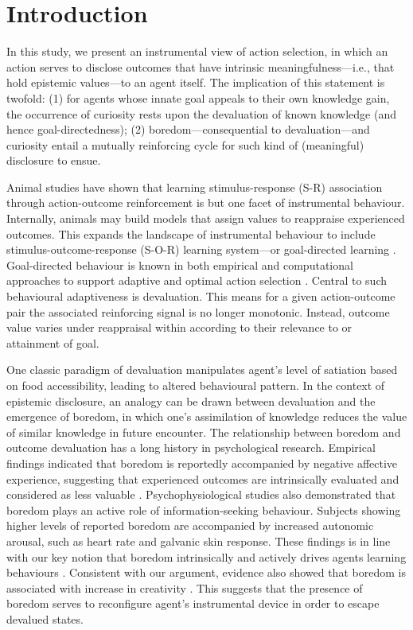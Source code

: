 \documentclass[utf8]{frontiersSCNS}
\begin{document}
\section{Introduction}

In this study, we present an instrumental view of action selection, in which an action serves to disclose outcomes that have intrinsic meaningfulness---i.e., that hold epistemic values---to an agent itself. The implication of this statement is twofold: (1) for agents whose innate goal appeals to their own knowledge gain, the occurrence of curiosity rests upon the devaluation of known knowledge (and hence goal-directedness); (2) boredom---consequential to devaluation---and curiosity entail a mutually reinforcing cycle for such kind of (meaningful) disclosure to ensue.

Animal studies have shown that learning stimulus-response (S-R) association through action-outcome reinforcement is but one facet of instrumental behaviour. Internally, animals may build models that assign values to reappraise experienced outcomes. This expands the landscape of instrumental behaviour to include stimulus-outcome-response (S-O-R) learning system---or goal-directed learning \citep{Balleine.1998}. Goal-directed behaviour is known in both empirical and computational approaches to support adaptive and optimal action selection \citep{adams1981instrumental, adams1982variations, mannella2016goal}. Central to such behavioural adaptiveness is devaluation. This means for a given action-outcome pair the associated reinforcing signal is no longer monotonic. Instead, outcome value varies under reappraisal within according to their relevance to or attainment of goal. 

One classic paradigm of devaluation manipulates agent's level of satiation based on food accessibility, leading to altered behavioural pattern. In the context of epistemic disclosure, an analogy can be drawn between devaluation and the emergence of boredom, in which one's assimilation of knowledge reduces the value of similar knowledge in future encounter. The relationship between boredom and outcome devaluation has a long history in psychological research. Empirical findings indicated that boredom is reportedly accompanied by negative affective experience, suggesting that experienced outcomes are intrinsically evaluated and considered as less valuable \citep{bench2013function, van2012boredom, fahlman2009does, perkins1985cognitive, vodanovich1991boredom}. Psychophysiological studies also demonstrated that boredom plays an active role of information-seeking behaviour. Subjects showing higher levels of reported boredom are accompanied by increased autonomic arousal, such as heart rate and galvanic skin response. These findings is in line with our key notion that boredom intrinsically and actively drives agents learning behaviours \citep{london1972increase, harris2000correlates}. Consistent with our argument, evidence also showed that boredom is associated with increase in creativity \citep{harris2000correlates, schubert1977boredom, schubert1978creativity}. This suggests that the presence of boredom serves to reconfigure agent's instrumental device in order to escape devalued states.
\end{document}
